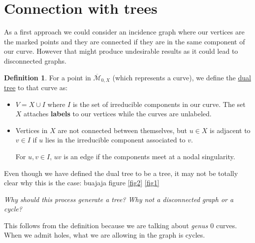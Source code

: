 \documentclass[11pt]{article}
\newcommand{\ov}{\overline}        %
\newcommand{\cM}{\mathcal{M}}           %
\theoremstyle{definition}
\newtheorem{Def}{Definition}           %
\theoremstyle{remark}
\numberwithin{theorem}{section}
\begin{document}
\section{Connection with trees}

As a first approach we could consider an incidence graph where our vertices are the marked points and they are connected if they are in the same component of our curve. However that might produce undesirable results as it could lead to disconnected graphs.

\begin{Def}
For a point in $\ov{\cM}_{0,X}$ (which represents a curve), we define the \underline{dual tree} to that curve as:
\begin{itemize}
    \item $V=X\cup I$ where $I$ is the set of irreducible components in our curve. The set $X$ attaches \textbf{labels} to our vertices while the curves are unlabeled.
    \item Vertices in $X$ are not connected between themselves, but $u\in X$ is adjacent to $v\in I$ if $u$ lies in the irreducible component associated to $v$.\par 
    For $u,v\in I$, $uv$ is an edge if the components meet at a nodal singularity.
\end{itemize}
\end{Def}

Even though we have defined the dual tree to be a tree, it may not be totally clear why this is the case: buajaja figure \ref{fig2} \ref{fig1}
\begin{center}\begin{minipage}{0.9\textwidth}\centering\em
    Why should this process generate a tree? Why not a disconnected graph or a cycle?
\end{minipage}\end{center}
This follows from the definition because we are talking about \emph{genus $0$} curves. When we admit holes, what we are allowing in the graph is cycles.
\end{document}
